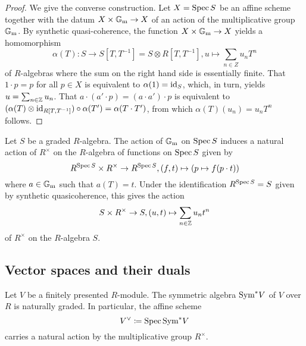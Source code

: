 \begin{proof}
  We give the converse construction.  Let $X = \operatorname{Spec} S$ be an affine
  scheme together with the datum $X \times \mathbb{G}_\mathrm{m} \to X$ of an action of
  the multiplicative group $\mathbb{G}_\mathrm{m}$.  By synthetic quasi-coherence, the
  function $X \times \mathbb{G}_\mathrm{m} \to X$ yields a homomorphism
  \begin{equation*}
    \alpha(T)\colon S \to S[T, T^{-1}] = S \otimes R[T, T^{-1}], u \mapsto \sum_{n \in Z} u_n T^n
  \end{equation*}
  of $R$-algebras where the sum on the right hand side is essentially
  finite.  That $1 \cdot p = p$ for all $p \in X$ is equivalent to
  $\alpha(1) = \mathrm{id}_S$, which, in turn, yields
  $u = \sum_{n \in \mathbb{Z}} u_n$.  That $a \cdot (a' \cdot p) = (a \cdot a') \cdot p$ is equivalent to
  $(\alpha(T) \otimes \mathrm{id}_{R[T, T^{-1}]}) \circ \alpha(T') = \alpha(T \cdot T')$, from which $\alpha(T) (u_n) = u_n T^n$ follows.
\end{proof}

\begin{remark}
  Let $S$ be a graded $R$-algebra.  The action of $\mathbb{G}_\mathrm{m}$ on $\operatorname{Spec} S$ induces a natural action of $R^\times$ on the $R$-algebra of functions
  on $\operatorname{Spec} S$ given by
  \begin{equation*}
    R^{\operatorname{Spec} S} \times R^\times \to R^{\operatorname{Spec} S}, (f, t) \mapsto (p \mapsto f(p \cdot t))
  \end{equation*}
  where $a \in \mathbb{G}_\mathrm{m}$ such that $a(T) = t$.
  Under the identification $R^{\operatorname{Spec} S} = S$ given by synthetic quasicoherence, this gives the action
  \begin{equation*}
    S \times R^\times \to S, (u, t) \mapsto \sum_{n \in \mathbb{Z}} u_n t^n
  \end{equation*}
  of $R^\times$ on the $R$-algebra $S$.
\end{remark}

\subsection{Vector spaces and their duals}

\begin{example}
  Let $V$ be a finitely presented $R$-module.  The symmetric algebra
  $\mathrm{Sym}^* V$ of $V$ over $R$ is naturally graded.  In particular, the
  affine scheme
  \begin{equation*}
    V\spcheck \coloneqq \Spec \Sym^* V
  \end{equation*}
  carries a natural action by the multiplicative group $R^\times$.
\end{example}

